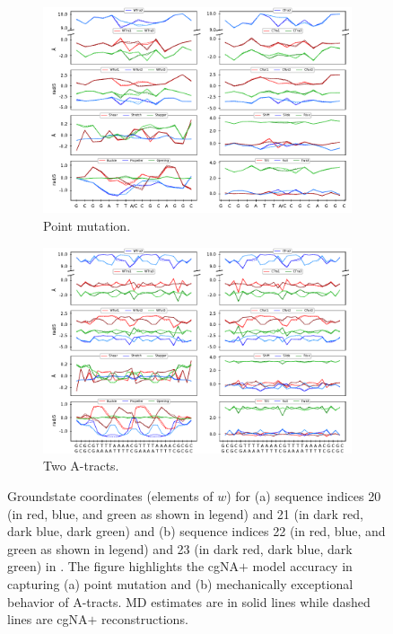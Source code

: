 \begin{figure}[H]
  \begin{subfigure}{15cm}
    \centering\includegraphics[scale=1]{images/Xpalin_compare_thesis.pdf}
    \centering\caption{ Point mutation.}
  \end{subfigure} 

  \begin{subfigure}{15cm}
    \centering\includegraphics[scale=1]{images/DNA_compare_seq_22_23.pdf} 
    \centering\caption{ Two A-tracts. }
  \end{subfigure}
\centering\caption{Groundstate coordinates (elements of $w$) for (a) sequence indices 20 (in red, blue, and green as shown in legend) and 21 (in dark red, dark blue, dark green) and (b) sequence indices 22 (in red, blue, and green as shown in legend) and 23 (in dark red, dark blue, dark green) in \Lbdna. The figure highlights the cgNA$+$ model accuracy in capturing (a) point mutation and (b) mechanically exceptional behavior of A-tracts.
MD estimates are in solid lines while dashed lines are cgNA$+$ reconstructions.}
\label{c4:figure1}
\end{figure}
